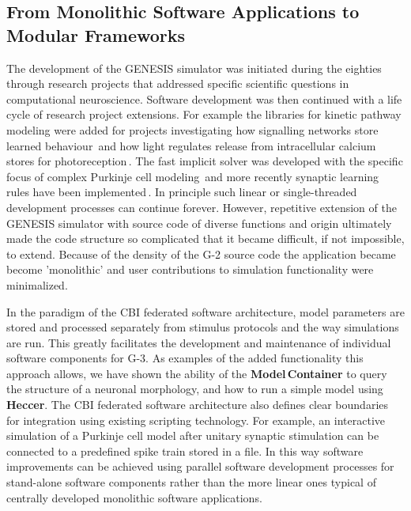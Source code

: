 \documentclass[12pt]{article}
\begin{document}
\subsection{From Monolithic Software Applications to Modular
  Frameworks}
\label{sec:from-monol-softw}
The development of the GENESIS simulator was initiated during the
eighties through research projects that addressed specific scientific
questions in computational neuroscience.  Software development was
then continued with a life cycle of research project extensions.  For
example the libraries for kinetic pathway modeling were added for
projects investigating how signalling networks store learned
behaviour\,\cite{bhalla99:_emerg} and how light regulates release from
intracellular calcium stores for
photoreception\,\cite{blackwell00:_eviden_distin_light_induc_calcium}.
The fast implicit solver was developed with the specific focus of
complex Purkinje cell modeling\,\cite{deschutter94:_purkin_i,
  deschutter94:_purkin_ii} and more recently synaptic learning rules
have been
implemented\,\cite{guenay08:_chann_densit_distr_explain_spikin}.  In
principle such linear or single-threaded development processes can
continue forever.  However, repetitive extension of the GENESIS
simulator with source code of diverse functions and origin
ultimately made the code structure so complicated that it became
difficult, if not impossible, to extend.  Because of the density of
the G-2 source code the application became become 'monolithic' and 
user contributions to simulation functionality were minimalized.

In the paradigm of the CBI federated software architecture, model
parameters are stored and processed separately from stimulus protocols and the way
simulations are run.  This greatly facilitates the development and
maintenance of individual
software components for G-3.  As examples of the added functionality this approach 
allows, we have shown the ability of the
{\bf Model\,Container} to query the structure of a neuronal morphology,
and how to run a simple model using {\bf Heccer}.  The CBI federated
software architecture also defines clear
boundaries for integration using existing scripting technology.
For example, an interactive simulation of a Purkinje cell model
after unitary synaptic stimulation can be connected to a predefined spike train
stored in a file.  In this way software improvements can be achieved
using parallel software development processes for stand-alone software
components rather than the more linear ones typical of centrally developed
monolithic software applications.
\end{document}
